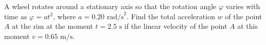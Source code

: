 
\item A wheel rotates around a stationary axis so that the rotation angle $\varphi$ varies with time as $\varphi = at^2$, where $a = 0.20 \text{ rad/s}^2$. Find the total acceleration $w$ of the point $A$ at the rim at the moment $t = 2.5 \text{ s}$ if the linear velocity of the point $A$ at this moment $v = 0.65 \text{ m/s}$.
